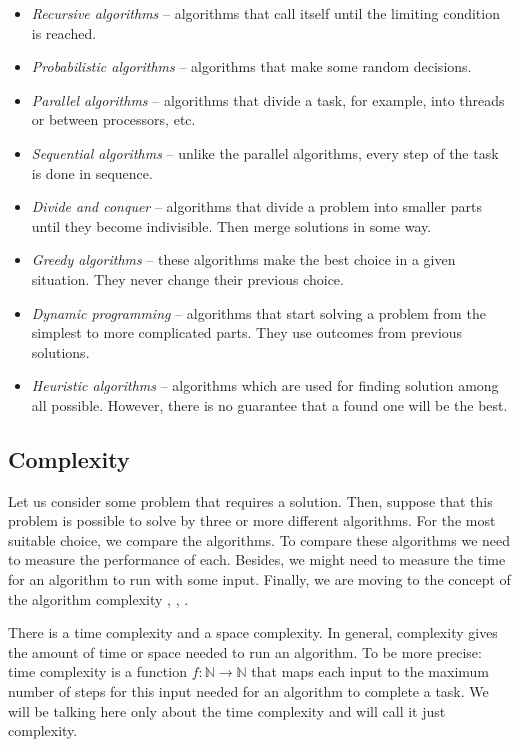 \documentclass[
  field=inf,
  biblatex,
  language=english,
  glossaries,
  theorems=false,
  sourcecodes=false,
  index
]{kidiplom}
\begin{document}
\begin{itemize}
	\item \textit{Recursive algorithms} -- algorithms that call itself until the limiting condition is reached.
	\item \textit{Probabilistic algorithms} -- algorithms that make some random decisions.
	\item \textit{Parallel algorithms} -- algorithms that divide a task, for example, into threads or between processors, etc.
	\item \textit{Sequential algorithms} -- unlike the parallel algorithms, every step of the task is done in sequence.
	\item \textit{Divide and conquer} -- algorithms that divide a problem into smaller parts until they become indivisible. Then merge solutions in some way.
	\item \textit{Greedy algorithms} -- these algorithms make the best choice in a given situation. They never change their previous choice.
	\item \textit{Dynamic programming} -- algorithms that start solving a problem from the simplest to more complicated parts. They use outcomes from previous solutions.
	\item \textit{Heuristic algorithms} -- algorithms which are used for finding solution among all possible. However, there is no guarantee that a found one will be the best.
\end{itemize}

\subsection{Complexity}

Let us consider some problem that requires a solution. Then, suppose that this problem is possible to solve by three or more different algorithms. For the most suitable choice, we compare the algorithms. To compare these algorithms we need to measure the performance of each. Besides, we might need to measure the time for an algorithm to run with some input. Finally, we are moving to the concept of the algorithm complexity \citep{knuth1}, \cite{sipser}, \cite{alm2}.

There is a time complexity and a space complexity. In general, complexity gives the amount of time or space needed to run an algorithm. To be more precise: time complexity is a function $f:\mathbb{N}\to\mathbb{N}$ that maps each input to the maximum number of steps for this input needed for an algorithm to complete a task. We will be talking here only about the time complexity and will call it just complexity.
\end{document}
